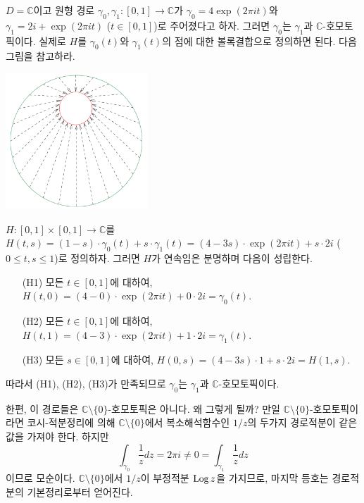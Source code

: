 \begin{saltexample}[label=example-3-8]{}{}
$D=\mathbb C$이고 원형 경로 $\gamma_0, \gamma_1 : [0,1] \to \mathbb C$가
$\gamma_0 = 4\exp(2\pi it)$와 $\gamma_1 = 2i+\exp(2\pi it)$ ($t\in[0,1]$)로 주어졌다고 하자.
그러면 $\gamma_0$는 $\gamma_1$과 $\mathbb C$-호모토픽이다.
실제로  $H$를 $\gamma_0(t)$와 $\gamma_1(t)$의 점에 대한 볼록결합으로 정의하면 된다.
다음 그림을 참고하라.

\begin{center}
\includegraphics[width=0.4\textwidth]{./SaltChapter/figs/fig-3-0-3}
\end{center}

$H:[0,1]\times [0,1] \to \mathbb C$를 
$H(t,s) = (1-s)\cdot \gamma_0(t) + s\cdot \gamma_1(t)
= (4-3s)\cdot \exp(2\pi it) + s\cdot 2i$ ($0\le t,s\le 1$)로 정의하자.
그러면 $H$가 연속임은 분명하며 다음이 성립한다.
\begin{itemize}
\item[(H1)] 모든 $t\in [0,1]$에 대하여, $H(t,0)= (4-0)\cdot \exp(2\pi it) + 0\cdot 2i = \gamma_0(t)$.
\item[(H2)] 모든 $t\in [0,1]$에 대하여, $H(t,1)= (4-3)\cdot \exp(2\pi it) + 1\cdot 2i = \gamma_1(t)$.
\item[(H3)] 모든 $s\in [0,1]$에 대하여, $H(0,s)= (4-3s)\cdot 1 + s\cdot 2i = H(1,s)$.
\end{itemize}
따라서 (H1), (H2), (H3)가 만족되므로 
$\gamma_0$는 $\gamma_1$과 $\mathbb C$-호모토픽이다.

한편, 이 경로들은 $\mathbb C\setminus \{0\}$-호모토픽은 아니다.
왜 그렇게 될까? 만일 $\mathbb C\setminus \{0\}$-호모토픽이라면
코시-적분정리에 의해 $\mathbb C\setminus \{0\}$에서 복소해석함수인
$1/z$의 두가지 경로적분이 같은 값을 가져야 한다. 하지만
\[
\int_{\gamma_0} \dfrac 1z dz = 2\pi i \ne 0 = \int_{\gamma_1} \dfrac 1z dz
\]
이므로 모순이다. 
$\mathbb C\setminus \{0\}$에서 $1/z$이 부정적분 $\mathop{\mathrm{Log}} z$을 가지므로,
마지막 등호는 경로적분의 기본정리로부터 얻어진다.
\end{saltexample}

